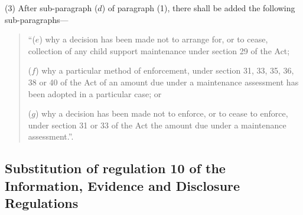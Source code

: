 \documentclass[a4paper]{article}
\begin{document}
(3) After sub-paragraph ($d$) of paragraph (1), there shall be added the following sub-paragraphs—
\begin{quotation}
“($e$) why a decision has been made not to arrange for, or to cease, collection of any child support maintenance under section 29 of the Act;

($f$) why a particular method of enforcement, under section 31, 33, 35, 36, 38 or 40 of the Act of an amount due under a maintenance assessment has been adopted in a particular case; or

($g$) why a decision has been made not to enforce, or to cease to enforce, under section 31 or 33 of the Act the amount due under a maintenance assessment.”.
\end{quotation}

\subsection[12. Substitution of regulation 10 of the Information, Evidence and Disclosure Regulations]{Substitution of regulation 10 of the Information, Evidence and Disclosure Regulations}
\end{document}
